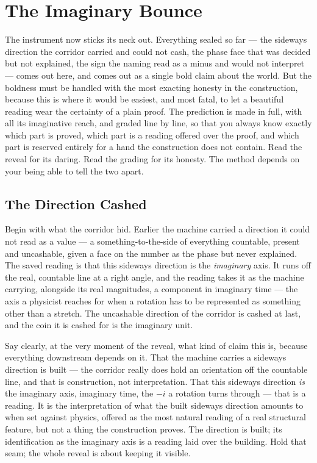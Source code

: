 \chapter{The Imaginary Bounce}

The instrument now sticks its neck out. Everything sealed so far --- the sideways direction the corridor carried
and could not cash, the phase face that was decided but not explained, the sign the naming read as a minus and
would not interpret --- comes out here, and comes out as a single bold claim about the world. But the boldness
must be handled with the most exacting honesty in the construction, because this is where it would be easiest, and most
fatal, to let a beautiful reading wear the certainty of a plain proof. The prediction is made in full, with all
its imaginative reach, and graded line by line, so that you always know exactly which part is proved, which part
is a reading offered over the proof, and which part is reserved entirely for a hand the construction does not
contain. Read the reveal for its daring. Read the grading for its honesty. The method depends on your being able
to tell the two apart.

\section{The Direction Cashed}

Begin with what the corridor hid. Earlier the machine carried a direction it could not read as a value --- a
something-to-the-side of everything countable, present and uncashable, given a face on the number as the phase but
never explained. The saved reading is that this sideways direction is the \emph{imaginary} axis. It runs off the
real, countable line at a right angle, and the reading takes it as the machine carrying, alongside its real
magnitudes, a component in imaginary time --- the axis a physicist reaches for when a
rotation has to be represented as something other than a stretch. The uncashable direction of the corridor is
cashed at last, and the coin it is cashed for is the imaginary unit.

Say clearly, at the very moment of the reveal, what kind of claim this is, because everything downstream depends
on it. That the machine carries a sideways direction is built --- the corridor really does hold an orientation off
the countable line, and that is construction, not interpretation. That this sideways direction \emph{is} the
imaginary axis, imaginary time, the $-i$ a rotation turns through --- that is a reading. It is the interpretation
of what the built sideways direction amounts to when set against physics, offered as the most
natural reading of a real structural feature, but not a thing the construction proves. The direction is built; its
identification as the imaginary axis is a reading laid over the building. Hold that seam; the whole reveal is
about keeping it visible.

